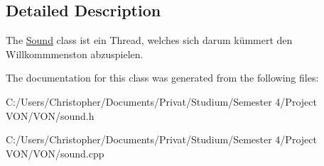 \subsection{Detailed Description}
The \hyperlink{class_sound}{Sound} class ist ein Thread, welches sich darum kümmert den Willkommmenston abzuspielen. 

The documentation for this class was generated from the following files\+:\begin{DoxyCompactItemize}
\item 
C\+:/\+Users/\+Christopher/\+Documents/\+Privat/\+Studium/\+Semester 4/\+Project V\+O\+N/\+V\+O\+N/sound.\+h\item 
C\+:/\+Users/\+Christopher/\+Documents/\+Privat/\+Studium/\+Semester 4/\+Project V\+O\+N/\+V\+O\+N/sound.\+cpp\end{DoxyCompactItemize}
